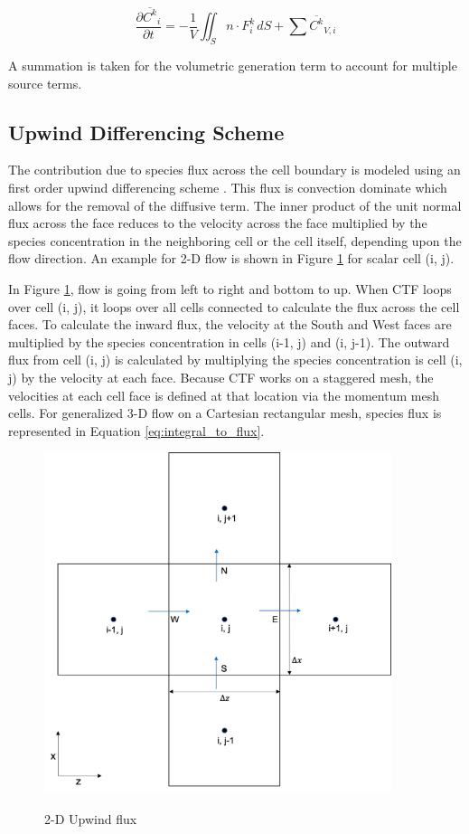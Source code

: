 \begin{equation}
    \frac{\partial \overline{C^{k}}_{i}}{\partial t} = - \frac{1}{V}\iint_S n \cdot F^{k}_{i} \,dS + \sum \overline{C^{k}}_{V,i}
    \label{eq:avg_transport_eqn}
\end{equation}

A summation is taken for the volumetric generation term to account for multiple source terms. 

\subsection{Upwind Differencing Scheme}
The contribution due to species flux across the cell boundary is modeled using an first order upwind differencing scheme \cite{versteeg2007}. This flux is convection dominate which allows for the removal of the diffusive term. The inner product of the unit normal flux across the face reduces to the velocity across the face multiplied by the species concentration in the neighboring cell or the cell itself, depending upon the flow direction. An example for 2-D flow is shown in Figure \ref{fig:upwind_difference_scheme} for scalar cell (i, j). 

In Figure \ref{fig:upwind_difference_scheme}, flow is going from left to right and bottom to up. When CTF loops over cell (i, j), it loops over all cells connected to calculate the flux across the cell faces. To calculate the inward flux, the velocity at the South and West faces are multiplied by the species concentration in cells (i-1, j) and (i, j-1). The outward flux from cell (i, j) is calculated by multiplying the species concentration is cell (i, j) by the velocity at each face. Because CTF works on a staggered mesh, the velocities at each cell face is defined at that location via the momentum mesh cells. For generalized 3-D flow on a Cartesian rectangular mesh, species flux is represented in Equation \ref{eq:integral_to_flux}.

\FloatBarrier
\newpage

\begin{figure}[p]
  \centering
  \includegraphics[width=4in]{images/2-DConvection.png}\\
  \caption{2-D Upwind flux}
  \label{fig:upwind_difference_scheme}
\end{figure}

